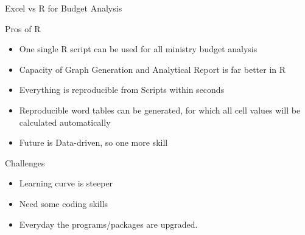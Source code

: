 \documentclass[aspectratio=169,11pt]{beamer}
\begin{document}
	
	\begin{frame}{Excel vs R for Budget Analysis}
		
		\begin{block}{Pros of R}
			\begin{itemize}[<+->]
				\item One single R script can be used for all ministry budget analysis
				\item Capacity of Graph Generation and Analytical Report is far better in R
				\item Everything is reproducible from Scripts within seconds
				\item Reproducible word tables can be generated, for which all cell values will be calculated automatically
				\item Future is Data-driven, so one more skill 
			\end{itemize}
		\end{block}
		
		\begin{block}{Challenges}
			\begin{itemize}[<+->]
				\item Learning curve is steeper
				\item Need some coding skills
				\item Everyday the programs/packages are upgraded.
			\end{itemize}
		\end{block}
		
		
		\vspace{0.3cm}
		
	\end{frame}
	
	
	
\end{document}
